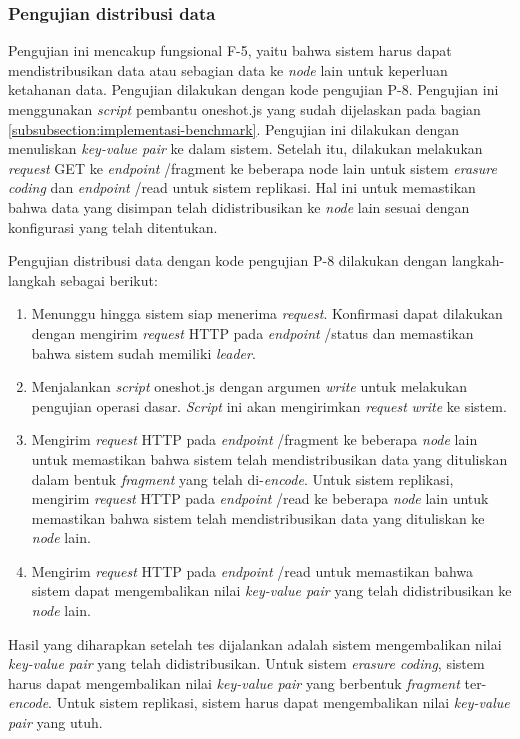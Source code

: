 \subsubsection{Pengujian distribusi data}
\label{subsubsection:pengujian-distribusi-data}

Pengujian ini mencakup fungsional F-5, yaitu bahwa sistem harus dapat mendistribusikan data atau sebagian data ke \textit{node} lain untuk keperluan ketahanan data. Pengujian dilakukan dengan kode pengujian P-8. Pengujian ini menggunakan \textit{script} pembantu oneshot.js yang sudah dijelaskan pada bagian \ref{subsubsection:implementasi-benchmark}. Pengujian ini dilakukan dengan menuliskan \textit{key-value pair} ke dalam sistem. Setelah itu, dilakukan melakukan \textit{request} GET ke \textit{endpoint} /fragment ke beberapa node lain untuk sistem \textit{erasure coding} dan \textit{endpoint} /read untuk sistem replikasi. Hal ini untuk memastikan bahwa data yang disimpan telah didistribusikan ke \textit{node} lain sesuai dengan konfigurasi yang telah ditentukan.

Pengujian distribusi data dengan kode pengujian P-8 dilakukan dengan langkah-langkah sebagai berikut:
\begin{enumerate}
    \item Menunggu hingga sistem siap menerima \textit{request}. Konfirmasi dapat dilakukan dengan mengirim \textit{request} HTTP pada \textit{endpoint} /status dan memastikan bahwa sistem sudah memiliki \textit{leader}.
    \item Menjalankan \textit{script} oneshot.js dengan argumen \textit{write} untuk melakukan pengujian operasi dasar. \textit{Script} ini akan mengirimkan \textit{request} \textit{write} ke sistem.
    \item Mengirim \textit{request} HTTP pada \textit{endpoint} /fragment ke beberapa \textit{node} lain untuk memastikan bahwa sistem telah mendistribusikan data yang dituliskan dalam bentuk \textit{fragment} yang telah di-\textit{encode}. Untuk sistem replikasi, mengirim \textit{request} HTTP pada \textit{endpoint} /read ke beberapa \textit{node} lain untuk memastikan bahwa sistem telah mendistribusikan data yang dituliskan ke \textit{node} lain.
    \item Mengirim \textit{request} HTTP pada \textit{endpoint} /read untuk memastikan bahwa sistem dapat mengembalikan nilai \textit{key-value pair} yang telah didistribusikan ke \textit{node} lain.
\end{enumerate}

Hasil yang diharapkan setelah tes dijalankan adalah sistem mengembalikan nilai \textit{key-value pair} yang telah didistribusikan. Untuk sistem \textit{erasure coding}, sistem harus dapat mengembalikan nilai \textit{key-value pair} yang berbentuk \textit{fragment} ter-\textit{encode}. Untuk sistem replikasi, sistem harus dapat mengembalikan nilai \textit{key-value pair} yang utuh.